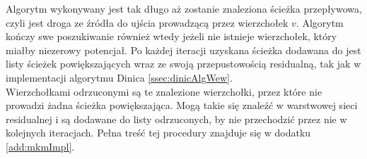 Algorytm wykonywany jest tak długo aż zostanie znaleziona ścieżka przepływowa, czyli jest droga ze źródła do ujścia prowadzącą przez wierzchołek $ v $. Algorytm kończy swe poszukiwanie również wtedy jeżeli nie istnieje wierzchołek, który miałby niezerowy potencjał. Po każdej iteracji uzyskana ścieżka dodawana do jest listy ścieżek powiększających wraz ze swoją przepustowością residualną, tak jak w implementacji algorytmu Dinica \ref{ssec:dinicAlgWew}.\\\indent
Wierzchołkami odrzuconymi są te znalezione wierzchołki, przez które nie prowadzi żadna ścieżka powiększająca. Mogą takie się znaleźć w warstwowej sieci residualnej i są dodawane do listy odrzuconych, by nie przechodzić przez nie w kolejnych iteracjach. Pełna treść tej procedury znajduje się w dodatku \ref{add:mkmImpl}.